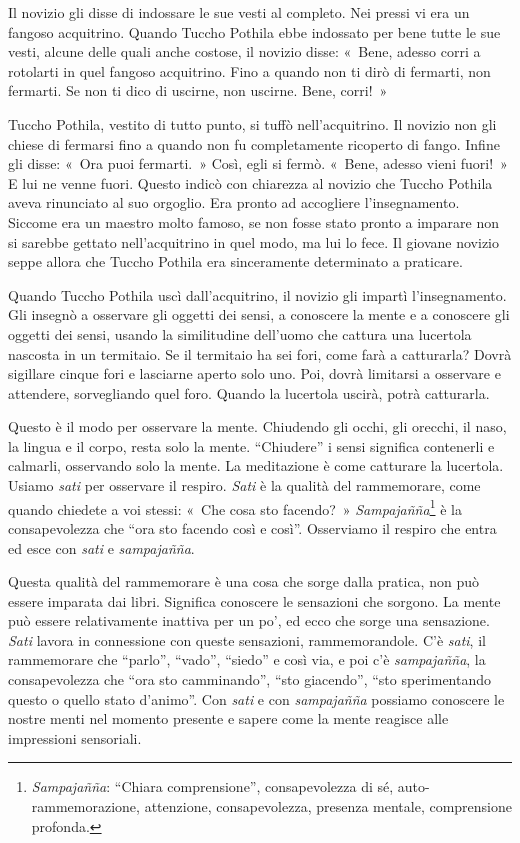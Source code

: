 Il novizio gli disse di indossare le sue vesti al completo. Nei pressi
vi era un fangoso acquitrino. Quando Tuccho Pothila ebbe indossato per
bene tutte le sue vesti, alcune delle quali anche costose, il novizio
disse: «~Bene, adesso corri a rotolarti in quel fangoso acquitrino. Fino
a quando non ti dirò di fermarti, non fermarti. Se non ti dico di
uscirne, non uscirne. Bene, corri!~»

Tuccho Pothila, vestito di tutto punto, si tuffò nell'acquitrino. Il
novizio non gli chiese di fermarsi fino a quando non fu completamente
ricoperto di fango. Infine gli disse: «~Ora puoi fermarti.~» Così, egli
si fermò. «~Bene, adesso vieni fuori!~» E lui ne venne fuori. Questo
indicò con chiarezza al novizio che Tuccho Pothila aveva rinunciato al
suo orgoglio. Era pronto ad accogliere l'insegnamento. Siccome era un
maestro molto famoso, se non fosse stato pronto a imparare non si
sarebbe gettato nell'acquitrino in quel modo, ma lui lo fece. Il giovane
novizio seppe allora che Tuccho Pothila era sinceramente determinato a
praticare.

Quando Tuccho Pothila uscì dall'acquitrino, il novizio gli impartì
l'insegnamento. Gli insegnò a osservare gli oggetti dei sensi, a
conoscere la mente e a conoscere gli oggetti dei sensi, usando la
similitudine dell'uomo che cattura una lucertola nascosta in un
termitaio. Se il termitaio ha sei fori, come farà a catturarla? Dovrà
sigillare cinque fori e lasciarne aperto solo uno. Poi, dovrà limitarsi
a osservare e attendere, sorvegliando quel foro. Quando la lucertola
uscirà, potrà catturarla.

Questo è il modo per osservare la mente. Chiudendo gli occhi, gli
orecchi, il naso, la lingua e il corpo, resta solo la mente.
``Chiudere'' i sensi significa contenerli e calmarli, osservando solo la
mente. La meditazione è come catturare la lucertola. Usiamo \emph{sati}
per osservare il respiro. \emph{Sati} è la qualità del rammemorare, come
quando chiedete a voi stessi: «~Che cosa sto facendo?~»
\emph{Sampajañña}\footnote{\emph{Sampajañña}: ``Chiara comprensione'',
  consapevolezza di sé, auto-rammemorazione, attenzione, consapevolezza,
  presenza mentale, comprensione profonda.} è la consapevolezza che
``ora sto facendo così e così''. Osserviamo il respiro che entra ed esce
con \emph{sati} e \emph{sampajañña}.

Questa qualità del rammemorare è una cosa che sorge dalla pratica, non
può essere imparata dai libri. Significa conoscere le sensazioni che
sorgono. La mente può essere relativamente inattiva per un po', ed ecco
che sorge una sensazione. \emph{Sati} lavora in connessione con queste
sensazioni, rammemorandole. C'è \emph{sati}, il rammemorare che
``parlo'', ``vado'', ``siedo'' e così via, e poi c'è \emph{sampajañña},
la consapevolezza che ``ora sto camminando'', ``sto giacendo'', ``sto
sperimentando questo o quello stato d'animo''. Con \emph{sati} e con
\emph{sampajañña} possiamo conoscere le nostre menti nel momento
presente e sapere come la mente reagisce alle impressioni sensoriali.

